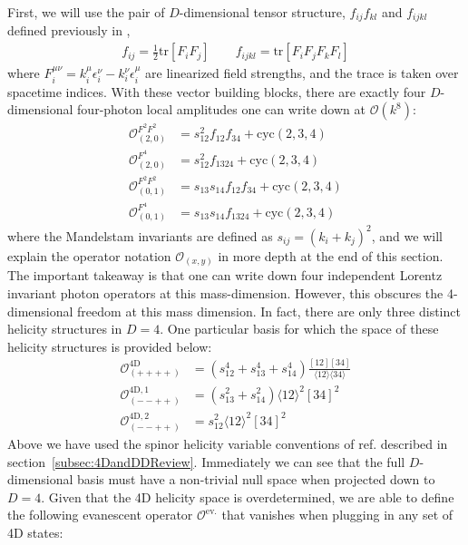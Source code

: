 \documentclass[12pt,letter]{article}
\def\sect#1{section~\ref{#1}}
\begin{document}
First, we will use the pair of $D$-dimensional tensor structure, $f_{ij}f_{kl}$ and $f_{ijkl}$ defined previously in \cite{Carrasco:2022jxn},
\begin{align}
f_{ij}= \frac{1}{2}\text{tr}[F_iF_j]\qquad f_{ijkl} = \text{tr}[F_iF_jF_kF_l]
\end{align}
where $F_i^{\mu\nu} = k_i^\mu \epsilon_i^\nu - k_i^\nu \epsilon_i^\mu$ are linearized field strengths, and the trace is taken over spacetime indices. With these vector building blocks, there are exactly four $D$-dimensional four-photon local amplitudes one can write down at $\mathcal{O}(k^8)$:
\begin{align}\label{eq:symVecBlocks}
\mathcal{O}_{(2,0)}^{F^2F^2} &= s_{12}^2 f_{12}f_{34} + \text{cyc}(2,3,4)
\\
\mathcal{O}_{(2,0)}^{F^4} &= s_{12}^2 f_{1324} + \text{cyc}(2,3,4)
\\
\mathcal{O}_{(0,1)}^{F^2F^2} &= s_{13}s_{14} f_{12}f_{34} + \text{cyc}(2,3,4)
\\
\mathcal{O}_{(0,1)}^{F^4} &= s_{13}s_{14} f_{1324} + \text{cyc}(2,3,4)
\end{align}
where the Mandelstam invariants are defined as $s_{ij} = (k_i+k_j)^2$, and we will explain the operator notation $\mathcal{O}_{(x,y)}$ in more depth at the end of this section. The important takeaway is that one can write down four independent Lorentz invariant photon operators at this mass-dimension. However, this obscures the 4-dimensional freedom at this mass dimension. In fact, there are only three distinct helicity structures in $D=4$. One particular basis for which the space of these helicity structures is provided below:
\begin{align}
\mathcal{O}^{4\text{D}}_{(++++)} &= (s_{12}^4 + s_{13}^4 + s_{14}^4 ) \frac{[12][34]}{\langle 12\rangle \langle34\rangle }
\\
\mathcal{O}^{4\text{D},1}_{(--++)} &= (s_{13}^2+s_{14}^2) \langle 12\rangle^2 [34]^2
\\
\mathcal{O}^{4\text{D},2}_{(--++)} &= s_{12}^2 \langle 12\rangle^2 [34]^2
\end{align}
Above we have used the spinor helicity variable conventions of ref. \cite{jjmcTASI2014} described in \sect{subsec:4DandDDReview}. Immediately we can see that the full $D$-dimensional basis must have a non-trivial null space when projected down to $D=4$. Given that the 4D helicity space is overdetermined, we are able to define the following evanescent operator $\mathcal{O}^{\text{ev.}}$ that vanishes when plugging in any set of 4D states:
\end{document}
